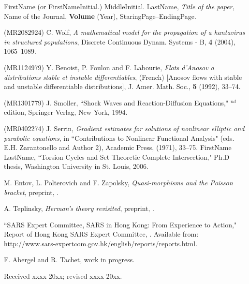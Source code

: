 \documentclass{aims}
\theoremstyle{definition}
\begin{document}
\begin{thebibliography}{99}

     \newblock FirstName (or FirstNameInitial.)  MiddleInitial. LastName, %
     \newblock \emph{Title of the paper},
     \newblock Name of the Journal, \textbf{Volume} (Year), StaringPage--EndingPage.

 (MR2082924)
     \newblock C.  Wolf,
     \newblock \emph{A mathematical model for the propagation of a hantavirus in structured populations},
     \newblock Discrete Continuous Dynam. Systems - B, \textbf{4} (2004), 1065--1089.

 (MR1124979)
    \newblock Y. Benoist, P. Foulon and F. Labourie, %
    \newblock \emph{Flots d'Anosov a distributions stable et instable
     differentiables},
    \newblock (French) [Anosov flows with stable and unstable differentiable
     distributions], J. Amer. Math. Soc., \textbf{5} (1992), 33--74.

 (MR1301779)
     \newblock J.  Smoller,
     \newblock ``Shock Waves and Reaction-Diffusion Equations,"
     $^{nd}$ edition,  Springer-Verlag, New York, 1994.

 (MR0402274)
    \newblock J. Serrin,
    \newblock  \emph{Gradient estimates for solutions of nonlinear elliptic
                     and parabolic equations},
    \newblock  in ``Contributions to Nonlinear Functional Analysis" (eds. E.H. Zarantonello and Author 2),
                Academic Press, (1971), 33--75.
    \newblock FirstName LastName,
    \newblock  ``Torsion Cycles and Set Theoretic Complete Intersection,"
    \newblock  Ph.D thesis, Washington University in St. Louis, 2006.

\newblock M. Entov, L. Polterovich and F. Zapolsky,
\newblock \emph{Quasi-morphisms
\newblock and the Poisson bracket}, preprint, .

\newblock A. Teplinsky,
\newblock \emph{Herman's theory revisited}, preprint,
\newblock {}.

\newblock
\newblock ``SARS Expert Committee, SARS in Hong Kong: From Experience to
Action," Report of Hong Kong SARS Expert Committee,
. Available from: \url{http://www.sars-expertcom.gov.hk/english/reports/reports.html}.

\newblock F. Abergel and R. Tachet,
\newblock
\newblock work in progress.

\end{thebibliography}

\medskip
Received xxxx 20xx; revised xxxx 20xx.
\medskip
\end{document}
